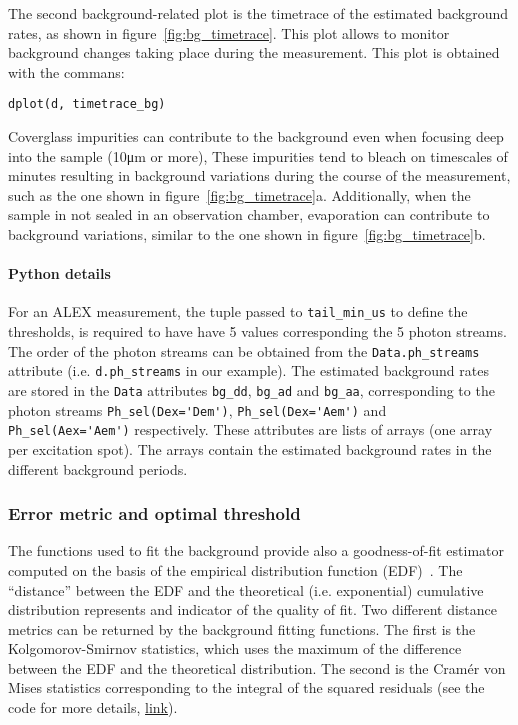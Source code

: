 The second background-related plot is the timetrace of the estimated background rates, 
as shown in figure~\ref{fig:bg_timetrace}. This plot allows to monitor background changes
taking place during the measurement. This plot is obtained with the commans:

\begin{lstlisting}
dplot(d, timetrace_bg)
\end{lstlisting}

Coverglass impurities can contribute to the background even when focusing 
deep into the sample (10μm or more),
These impurities tend to bleach on timescales of minutes resulting in
background variations during the course of the measurement, such as
the one shown in figure~\ref{fig:bg_timetrace}a.
Additionally, when the sample in not sealed in an observation chamber,
evaporation can contribute to background variations, similar to the
one shown in figure~\ref{fig:bg_timetrace}b.

\paragraph{Python details} For an ALEX measurement, the tuple passed to
\verb|tail_min_us| to define the thresholds, is required to have have 
5 values corresponding the 5 photon streams. 
The order of the photon streams can be obtained from
the \verb|Data.ph_streams| attribute (i.e. \verb|d.ph_streams| in our example).
The estimated background rates are stored in the \verb|Data| attributes
\verb|bg_dd|, \verb|bg_ad| and \verb|bg_aa|, corresponding to the photon
streams \verb|Ph_sel(Dex='Dem')|, \verb|Ph_sel(Dex='Aem')| and \verb|Ph_sel(Aex='Aem')|
respectively. These attributes are lists of arrays (one array per excitation spot).
The arrays contain the estimated background rates in the different background periods.

\subsubsection{Error metric and optimal threshold}

The functions used to fit the background provide also a goodness-of-fit estimator 
computed on the basis of the empirical distribution function (EDF)~\cite{Stephens1974,Parr1980}. 
The ``distance'' between the EDF and the theoretical (i.e. exponential) cumulative distribution
represents and indicator of the quality of fit.
Two different distance metrics can be returned by the background fitting functions.
The first is the Kolgomorov-Smirnov statistics, which uses the maximum of the difference 
between the EDF and the theoretical distribution. The second is the Cramér von Mises
statistics corresponding to the integral of the squared residuals
(see the code for more details,
\href{https://github.com/tritemio/FRETBursts/blob/master/fretbursts/background.py#L41}{link}).

